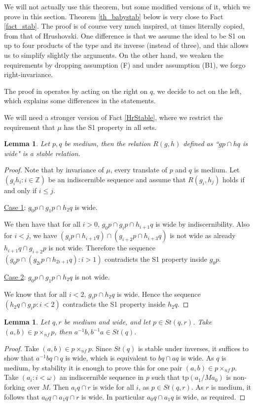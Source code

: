 \documentclass[12pt]{article}
\newtheorem{lemme}[thm]{Lemma}
\theoremstyle{definition}
\theoremstyle{mystyle}
\theoremstyle{remark}
\newcommand{\tp}{\mathrm{tp}}
\newcommand{\nf}{\times_{nf}}
\begin{document}
We will not actually use this theorem, but some modified versions of it, which we prove in this section. Theorem \ref{th_babystab} below is very close to Fact \ref{fact_stab}. The proof is of course very much inspired, at times literally copied, from that of Hrushovski. One difference is that we assume the ideal to be S1 on up to four products of the type and its inverse (instead of three), and this allows us to simplify slightly the arguments. On the other hand, we weaken the requirements by dropping assumption (F) and under assumption (B1), we forgo right-invariance.


The proof in \cite{Hru12} operates by acting on the right on
$q$, we decide to act on the left, which explains some differences
in the statements.


\medskip

We will need a stronger version of Fact \ref{HrStable}, where we restrict the requirement that $\mu$ has the S1 property in all sets.



\begin{lemme}
Let $p, q$ be medium, then the relation $R(g,h)$ defined as ``$gp\cap hq$ is wide" is a stable relation.
\end{lemme}
\begin{proof}
Note that by invariance of $\mu$, every translate of $p$ and $q$ is medium. Let $(g_i h_i :i \in \mathbb Z)$ be an indiscernible sequence and assume that $R(g_i,h_j)$ holds if and only if $i\leq j$.

\medskip \noindent
\underline{Case 1}: $g_0 p \cap g_1 p \cap h_2 q$ is wide.

\smallskip
We then have that for all $i>0$, $g_0 p \cap g_i p \cap h_{i+1} q$ is wide by indiscernibility. Also for $i<j$, we have $(g_i p \cap h_{i+1}q) \cap( g_{i+2} p \cap h_{i+3}q)$ is not wide as already $h_{i+1}q \cap g_{i+2}p$ is not wide. Therefore the sequence $(g_0 p \cap (g_{2i}p \cap h_{2i+1}q):i>1)$ contradicts the S1 property inside $g_0 p$.

\medskip \noindent
\underline{Case 2}: $g_0 p \cap g_1 p \cap h_2 q$ is not wide.

\smallskip
We know that for all $i<2$, $g_i p \cap h_2 q$ is wide. Hence the sequence $(h_2 q \cap g_i p : i<2)$ contradicts the S1 property inside $h_2 q$.
\end{proof}

\begin{lemme}\label{lem0}
Let $q,r$ be medium and wide, and let $p\in St(q,r)$. Take $(a,b)\in p\nf p$, then $a^{-1}b, b^{-1}a \in St(q)$.
\end{lemme}
\begin{proof}
Take $(a,b)\in p\nf p$. Since $St(q)$ is stable under inverses, it suffices to show that $a^{-1}b q\cap q$ is wide, which is equivalent to $b q \cap a q$ is wide. As $q$ is medium, by stability it is enough to prove this for one pair $(a,b)\in p\nf p$. Take $(a_i:i<\omega)$ an indiscernible sequence in $p$ such that $\tp(a_1/Ma_0)$ is non-forking over $M$. Then $a_i q \cap r$ is wide for all $i$, as $p\in St(q,r)$. As $r$ is medium, it follows that $a_0 q \cap a_1 q \cap r$ is wide. In particular $a_0 q \cap a_1 q$ is wide, as required.
\end{proof}
\end{document}

